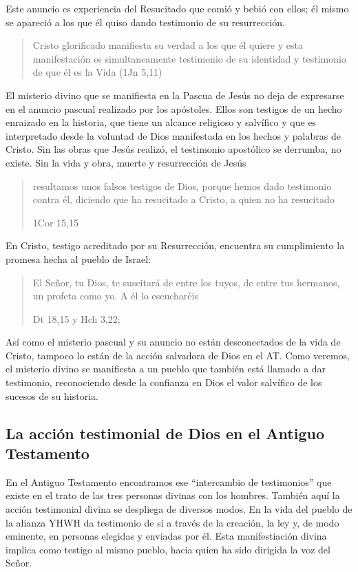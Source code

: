 Este anuncio es experiencia del Resucitado que comió y bebió con ellos; él mismo
se apareció a los que él quiso dando testimonio de su resurrección.
\blockquote[{\cite[129]{prades2015testimonio}}]{Cristo glorificado manifiesta su
  verdad a los que él quiere y esta manifestación es simultaneamente testimonio
  de su identidad y testimonio de que él es la Vida (1Jn 5,11)}

El misterio divino que se manifiesta en la Pascua de Jesús no deja de expresarse
en el anuncio pascual realizado por los apóstoles. Ellos son testigos de un
hecho enraizado en la historia, que tiene un alcance religioso y salvífico y que
es interpretado desde la voluntad de Dios manifestada en los hechos y palabras
de Cristo. Sin las obras que Jesús realizó, el testimonio apostólico se
derrumba, no existe.\autocite[Cf.][1529]{latourelle2000testimonio} Sin la vida y
obra, muerte y resurrección de Jesús \blockquote[1Cor 15,15]{resultamos unos
  falsos testigos de Dios, porque hemos dado testimonio contra él, diciendo que
  ha resucitado a Cristo, a quien no ha resucitado}.

En Cristo, testigo acreditado por su Resurrección, encuentra su cumplimiento la
promesa hecha al pueblo de Israel: \blockquote[Dt 18,15 y Hch 3,22;
{\cite[Cf.~][24ss]{ratzinger2007jdenaz}}]{El Señor, tu Dios, te suscitará de
  entre los tuyos, de entre tus hermanos, un profeta como yo. A él lo
  escucharéis}. Así como el misterio pascual y su anuncio no están desconectados
de la vida de Cristo, tampoco lo están de la acción salvadora de Dios en el AT.
Como veremos, el misterio divino se manifiesta a un pueblo que también está
llamado a dar testimonio, reconociendo desde la confianza en Dios el valor
salvífico de los sucesos de su historia.

\subsection{La acción testimonial de Dios en el Antiguo Testamento}

En el Antiguo Testamento encontramos ese \enquote{intercambio de testimonios}
que existe en el trato de las tres personas divinas con los
hombres.\autocite[Cf.][1531]{latourelle2000testimonio} También aquí la acción
testimonial divina se despliega de diversos modos. En la vida del pueblo de la
alianza YHWH da testimonio de sí a través de la creación, la ley y, de modo
eminente, en personas elegidas y enviadas por
él.\autocite[Cf.][114s]{prades2015testimonio} Esta manifestiación divina implica
como testigo al mismo pueblo, hacia quien ha sido dirigida la voz del Señor.

